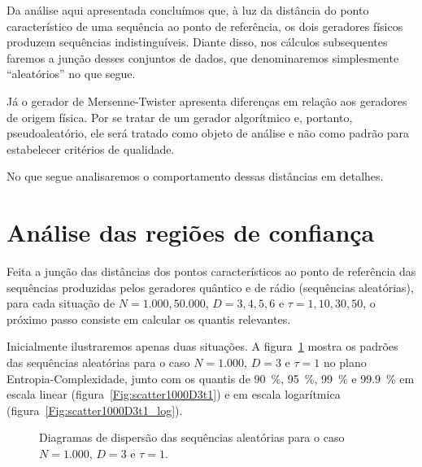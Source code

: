 
Da análise aqui apresentada concluímos que, à luz da distância do ponto característico de uma sequência ao ponto de referência, os dois geradores físicos produzem sequências indistinguíveis.
Diante disso, nos cálculos subsequentes faremos a junção desses conjuntos de dados, que denominaremos simplesmente ``aleatórios'' no que segue.

Já o gerador de Mersenne-Twister apresenta diferenças em relação aos geradores de origem física.
Por se tratar de um gerador algorítmico e, portanto, pseudoaleatório, ele será tratado como objeto de análise e não como padrão para estabelecer critérios de qualidade.

No que segue analisaremos o comportamento dessas distâncias em detalhes.

\section{Análise das regiões de confiança}

Feita a junção das distâncias dos pontos característicos ao ponto de referência das sequências produzidas pelos geradores quântico e de rádio (sequências aleatórias), 
para cada situação de $N=1.000, 50.000$, $D=3, 4, 5, 6$ e $\tau=1, 10, 30, 50$, o próximo passo consiste em calcular os quantis relevantes.

Inicialmente ilustraremos apenas duas situações.
A figura~\ref{Fig:AleattD3tau1} mostra os padrões das sequências aleatórias para o caso $N=1.000$, $D=3$ e $\tau=1$ no plano Entropia-Complexidade, junto com os quantis de \SI{90}{\percent}, \SI{95}{\percent}, \SI{99}{\percent} e \SI{99,9}{\percent} em escala linear (figura~\ref{Fig:scatter1000D3t1}) e em escala logarítmica (figura~\ref{Fig:scatter1000D3t1_log}).

\begin{figure}
\centering
{}
\caption{Diagramas de dispersão das sequências aleatórias para o caso $N=1.000$, $D=3$ e $\tau=1$.}\label{Fig:AleattD3tau1}
\end{figure}

